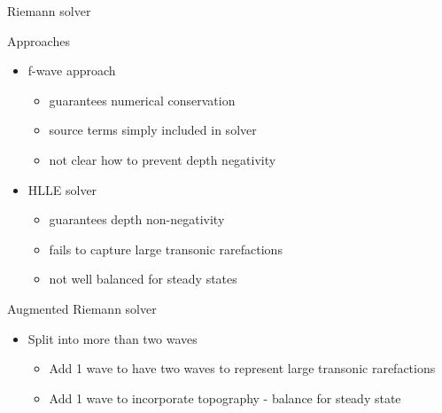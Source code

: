 \documentclass[xcolor=dvipsnames]{beamer}
\begin{document}
\begin{frame}[label=sec-4-2]{Riemann solver}
\begin{block}{Approaches}
\begin{itemize}
\item f-wave approach
\begin{itemize}
\item guarantees numerical conservation
\item source terms simply included in solver
\item not clear how to prevent depth negativity
\end{itemize}
\item HLLE solver
\begin{itemize}
\item guarantees depth non-negativity
\item fails to capture large transonic rarefactions
\item not well balanced for steady states
\end{itemize}
\end{itemize}
\end{block}

\begin{block}{Augmented Riemann solver}
\begin{itemize}
\item Split into more than two waves
\begin{itemize}
\item Add 1 wave to have two waves to represent large transonic rarefactions
\item Add 1 wave to incorporate topography - balance for steady state
\end{itemize}
\end{itemize}
\end{block}
\end{frame}
\end{document}
